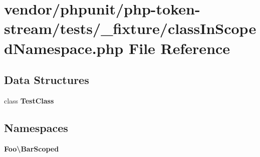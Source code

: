 \section{vendor/phpunit/php-\/token-\/stream/tests/\+\_\+fixture/class\+In\+Scoped\+Namespace.php File Reference}
\label{class_in_scoped_namespace_8php}
\subsection*{Data Structures}
\begin{DoxyCompactItemize}
\item 
class {\bf Test\+Class}
\end{DoxyCompactItemize}
\subsection*{Namespaces}
\begin{DoxyCompactItemize}
\item 
 {\bf Foo\textbackslash{}\+Bar\+Scoped}
\end{DoxyCompactItemize}
